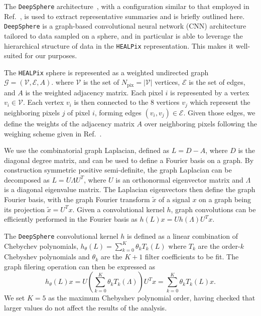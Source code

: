 \documentclass[prd,aps,10pt,nofootinbib,twocolumn,superscriptaddress,preprintnumbers,balancelastpage,longbibliography]{revtex4-1}
\begin{document}
The \texttt{DeepSphere} architecture~\cite{defferrard2020deepsphere,Perraudin:2018rbt,deepsphere_rlgm}, with a configuration similar to that employed in Ref.~\cite{List:2020mzd}, is used to extract representative summaries and is briefly outlined here. \texttt{DeepSphere} is a graph-based convolutional neural network (CNN) architecture tailored to data sampled on a sphere, and in particular is able to leverage the hierarchical structure of data in the \texttt{HEALPix} representation. This makes it well-suited for our purposes.

The \texttt{HEALPix} sphere is represented as a weighted undirected graph $\mathcal G = (\mathcal V, \mathcal E, A)$.  where $\mathcal V$ is the set of $N_\mathrm{pix} = |\mathcal V|$ vertices, $\mathcal E$ is the set of edges, and $A$ is the weighted adjacency matrix. Each pixel $i$ is represented by a vertex $v_i \in \mathcal V$. Each vertex $v_i$ is then connected to the 8 %
vertices $v_j$ which represent the neighboring pixels $j$ of pixel $i$, forming edges $(v_i
, v_j) \in \mathcal E$. Given those edges, we define the weights of the adjacency matrix $ A$ over neighboring pixels following the weighing scheme given in Ref.~\cite{defferrard2020deepsphere}.

We use the combinatorial graph Laplacian, defined as $ L =  D -  A$, where $ D$ is the diagonal degree matrix, and can be used to define a Fourier basis on a graph. By construction symmetric positive semi-definite, the graph Laplacian can be decomposed as $ L =  U  \Lambda  U^T$, where $ U$ is an orthonormal eigenvector matrix and $ \Lambda$ is a diagonal eigenvalue matrix. The Laplacian eigenvectors then define the graph Fourier basis, with the graph Fourier transform $\tilde{ x}$ of a signal $ x$ on a graph being its projection $\tilde{x} =  U^T  x$.
Given a convolutional kernel $h$, graph convolutions can be efficiently performed in the Fourier basis as $h({L}) {x}={U} h({\Lambda}) {U}^{T} {x}$.

The \texttt{DeepSphere} convolutional kernel $h$ is defined as a linear combination of Chebychev polynomials, $h_{\theta}({{L}}) = \sum_{k=0}^{K} \theta_{k} T_{k}({{L}})$ where $T_k$ are the order-$k$ Chebyshev polynomials and $\theta_k$ are the $K + 1$ filter coefficients to be fit. The graph filering operation can then be expressed as
\begin{equation}
    h_{\theta}({L}) {x}={U}\left(\sum_{k=0}^{K} \theta_{k} T_k({\Lambda})\right) {U}^{T} {x}=\sum_{k=0}^{K} \theta_{k} T_k({L}) {x}.
\end{equation}
We set $K=5$ as the maximum Chebyshev polynomial order, having checked that larger values do not affect the results of the analysis.
\end{document}
